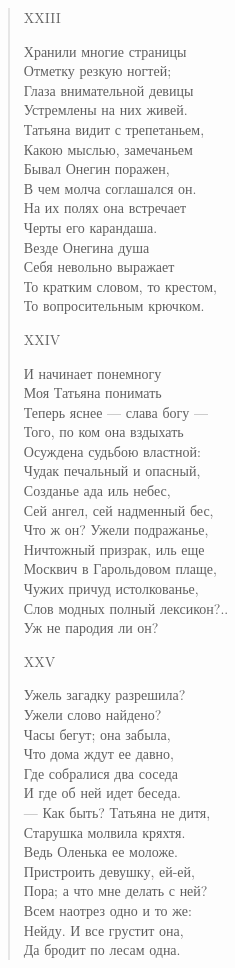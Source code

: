 \begin{verse}
XXIII

Хранили многие страницы\\
Отметку резкую ногтей;\\
Глаза внимательной девицы\\
Устремлены на них живей.\\
Татьяна видит с трепетаньем,\\
Какою мыслью, замечаньем\\
Бывал Онегин поражен,\\
В чем молча соглашался он.\\
На их полях она встречает\\
Черты его карандаша.\\
Везде Онегина душа\\
Себя невольно выражает\\
То кратким словом, то крестом,\\
То вопросительным крючком.

XXIV

И начинает понемногу\\
Моя Татьяна понимать\\
Теперь яснее — слава богу —\\
Того, по ком она вздыхать\\
Осуждена судьбою властной:\\
Чудак печальный и опасный,\\
Созданье ада иль небес,\\
Сей ангел, сей надменный бес,\\
Что ж он? Ужели подражанье,\\
Ничтожный призрак, иль еще\\
Москвич в Гарольдовом плаще,\\
Чужих причуд истолкованье,\\
Слов модных полный лексикон?..\\
Уж не пародия ли он?

XXV

Ужель загадку разрешила?\\
Ужели слово найдено?\\
Часы бегут; она забыла,\\
Что дома ждут ее давно,\\
Где собралися два соседа\\
И где об ней идет беседа.\\
— Как быть? Татьяна не дитя,\\
Старушка молвила кряхтя.\\
Ведь Оленька ее моложе.\\
Пристроить девушку, ей-ей,\\
Пора; а что мне делать с ней?\\
Всем наотрез одно и то же:\\
Нейду. И все грустит она,\\
Да бродит по лесам одна.


\end{verse}
